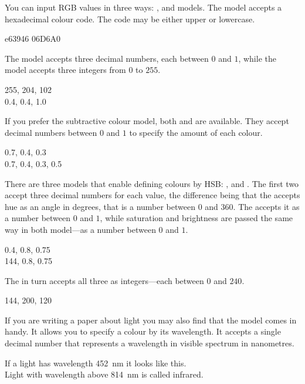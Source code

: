 You can input RGB values in three ways: ,  and
 models. The  model accepts a hexadecimal colour code.
The code may be either upper or lowercase.
\begin{example}
\textcolor[HTML]{e63946}{e63946}
\textcolor[HTML]{06D6A0}{06D6A0}
\end{example}
The  model accepts three decimal numbers, each between \(0\) and
\(1\), while the  model accepts three integers from \(0\) to \(255\).
\begin{example}
\textcolor[RGB]{255, 204, 102}{
  255, 204, 102
} \\
\textcolor[rgb]{0.4, 0.4, 1.0}{
  0.4, 0.4, 1.0
}
\end{example}

If you prefer the subtractive colour model, both  and  are
available. They accept decimal numbers between \(0\) and \(1\) to specify
the amount of each colour.
\begin{example}
\textcolor[cmy]{0.7, 0.4, 0.3}{
  0.7, 0.4, 0.3
} \\
\textcolor[cmyk]{
  0.7, 0.4, 0.3, 0.5
}{
  0.7, 0.4, 0.3, 0.5
}
\end{example}

There are three models that enable defining colours by HSB\@: ,
 and . The first two accept three decimal numbers for
each value, the difference being that the  accepts hue as an angle
in degrees, that is a number between \(0\) and \(360\). The  accepts
it as a number between \(0\) and \(1\), while saturation and brightness
are passed the same way in both model---as a number between \(0\) and \(1\).
\begin{example}
\textcolor[hsb]{
  0.4, 0.8, 0.75
}{
  0.4, 0.8, 0.75
}\\
\textcolor[Hsb]{
  144, 0.8, 0.75
}{
  144, 0.8, 0.75
}
\end{example}
The  in turn accepts all three as integers---each between \(0\) and
\(240\).
\begin{example}
\textcolor[HSB]{
  144, 200, 120
}{
  144, 200, 120
}
\end{example}

If you are writing a paper about light you may also find that the 
model comes in handy. It allows you to specify a colour by its wavelength. It
accepts a single decimal number that represents a wavelength in visible
spectrum in nanometres.
\begin{example}
\textcolor[wave]{452}{
  If a light has wavelength
  \qty{452}{\nm} it looks
  like this.
} \\
\textcolor[wave]{700}{
  Light with wavelength above
  \qty{814}{\nm} is called
  infrared.
}
\end{example}

